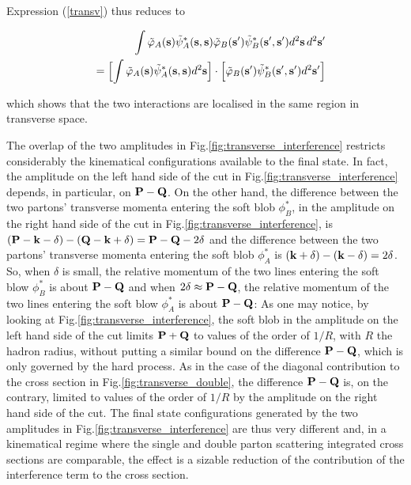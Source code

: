 \documentclass{ws-rv9x6}
\begin{document}
\noindent
Expression (\ref{transv}) thus reduces to 

\begin{eqnarray}
&&\int\tilde\varphi_A({\bf s})\tilde\psi^*_A({\bf s}, {\bf s})\tilde\varphi_B({\bf s}')\tilde\psi^*_B({\bf s}',{\bf s}')d^2{\bf s}\,d^2{\bf s}'\cr
&&=\Bigl[\int\tilde\varphi_A({\bf s})\tilde\psi^*_A({\bf s}, {\bf s})d^2{\bf s}\Bigr]\cdot\Bigl[\tilde\varphi_B({\bf s}')\tilde\psi^*_B({\bf s}',{\bf s}')d^2{\bf s}'\Bigr]
\nonumber
\end{eqnarray}

\noindent which shows that the two interactions are localised in the same region in transverse space. 

The overlap of the two amplitudes in Fig.\ref{fig:transverse_interference} restricts considerably the kinematical configurations available to the final state. In fact, the amplitude on the left hand side of the cut in Fig.\ref{fig:transverse_interference} depends, in particular, on $\bf P-Q$. On the other hand, the difference between the two partons' transverse momenta entering the soft blob $\phi_B^*$, in the amplitude on the right hand side of the cut in Fig.\ref{fig:transverse_interference}, is $({\bf P-k-\delta)-(Q-k+\delta)=P-Q}-2\delta$ and the difference between the two partons' transverse momenta entering the soft blob $\phi_A^*$ is $({\bf k+\delta)-(k-\delta)}=2\delta$. So, when $\delta$ is small, the relative momentum of the two lines entering the soft blow $\phi_B^*$ is about ${\bf P-Q}$ and when $2\delta\approx{\bf P-Q}$,  the relative momentum of the two lines entering the soft blow $\phi_A^*$ is about ${\bf P-Q}$: As one may notice, by looking at Fig.\ref{fig:transverse_interference}, the soft blob in the amplitude on the left hand side of the cut limits ${\bf P+Q}$ to values of the order of $1/R$, with $R$ the hadron radius, without putting a similar bound on the difference ${\bf P-Q}$, which is only governed by the hard process. As in the case of the diagonal contribution to the cross section in Fig.\ref{fig:transverse_double}, the difference ${\bf P-Q}$ is, on the contrary, limited to values of the order of $1/R$ by the amplitude on the right hand side of the cut. The final state configurations generated by the two amplitudes in Fig.\ref{fig:transverse_interference} are thus very different and, in a kinematical regime where the single and double parton scattering integrated cross sections are comparable, the effect is a sizable reduction of the contribution of the interference term to the cross section\cite{Calucci:2009ea}. 
\end{document}
